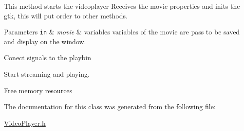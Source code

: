 This method starts the videoplayer Receives the movie properties and inits the gtk, this will put order to other methods. 
\begin{DoxyParams}[1]{Parameters}
\mbox{\tt in}  & {\em movie} & variables variables of the movie are pass to be saved and display on the window. \\
\hline
\end{DoxyParams}
Conect signals to the playbin

Start streaming and playing.

Free memory resources

The documentation for this class was generated from the following file\+:\begin{DoxyCompactItemize}
\item 
\hyperlink{VideoPlayer_8h}{Video\+Player.\+h}\end{DoxyCompactItemize}
